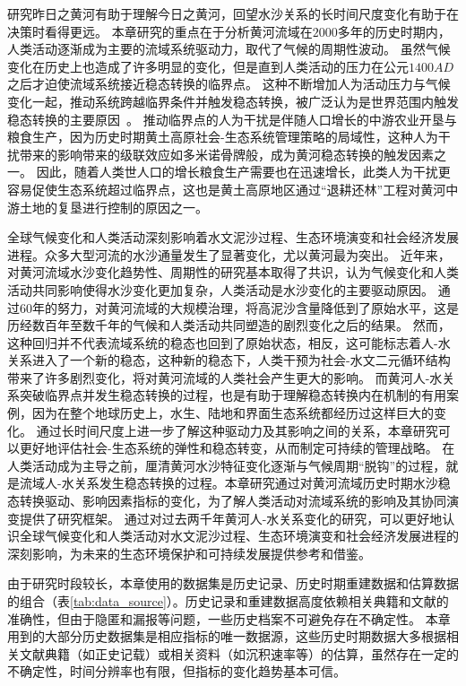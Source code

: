 研究昨日之黄河有助于理解今日之黄河，回望水沙关系的长时间尺度变化有助于在决策时看得更远。
本章研究的重点在于分析黄河流域在$2000$多年的历史时期内，人类活动逐渐成为主要的流域系统驱动力，取代了气候的周期性波动。
虽然气候变化在历史上也造成了许多明显的变化，但是直到人类活动的压力在公元$1400AD$之后才迫使流域系统接近稳态转换的临界点。
这种不断增加人为活动压力与气候变化一起，推动系统跨越临界条件并触发稳态转换，被广泛认为是世界范围内触发稳态转换的主要原因~\cite{scheffer2001,scheffer2003}。
推动临界点的人为干扰是伴随人口增长的中游农业开垦与粮食生产，因为历史时期黄土高原社会-生态系统管理策略的局域性，这种人为干扰带来的影响带来的级联效应如多米诺骨牌般，成为黄河稳态转换的触发因素之一\cite{rocha2018,wu2020a}。
因此，随着人类世人口的增长粮食生产需要也在迅速增长，此类人为干扰更容易促使生态系统超过临界点，这也是黄土高原地区通过“退耕还林”工程对黄河中游土地的复垦进行控制的原因之一。

全球气候变化和人类活动深刻影响着水文泥沙过程、生态环境演变和社会经济发展进程。众多大型河流的水沙通量发生了显著变化，尤以黄河最为突出\cite{best2019, best2020}。
近年来，对黄河流域水沙变化趋势性、周期性的研究基本取得了共识，认为气候变化和人类活动共同影响使得水沙变化更加复杂，人类活动是水沙变化的主要驱动原因\cite{wang2016a, ma2020}。
通过$60$年的努力，对黄河流域的大规模治理，将高泥沙含量降低到了原始水平，这是历经数百年至数千年的气候和人类活动共同塑造的剧烈变化之后的结果\cite{wang2016e, ji2018}。
然而，这种回归并不代表流域系统的稳态也回到了原始状态，相反，这可能标志着人-水关系进入了一个新的稳态，这种新的稳态下，人类干预为社会-水文二元循环结构带来了许多剧烈变化，将对黄河流域的人类社会产生更大的影响。
而黄河人-水关系突破临界点并发生稳态转换的过程，也是有助于理解稳态转换内在机制的有用案例，因为在整个地球历史上，水生、陆地和界面生态系统都经历过这样巨大的变化\cite{hughes2013, rocha2018}。
通过长时间尺度上进一步了解这种驱动力及其影响之间的关系，本章研究可以更好地评估社会-生态系统的弹性和稳态转变，从而制定可持续的管理战略\cite{scheffer2003}。
在人类活动成为主导之前，厘清黄河水沙特征变化逐渐与气候周期“脱钩”的过程，就是流域人-水关系发生稳态转换的过程。本章研究通过对黄河流域历史时期水沙稳态转换驱动、影响因素指标的变化，为了解人类活动对流域系统的影响及其协同演变提供了研究框架。
通过对过去两千年黄河人-水关系变化的研究，可以更好地认识全球气候变化和人类活动对水文泥沙过程、生态环境演变和社会经济发展进程的深刻影响，为未来的生态环境保护和可持续发展提供参考和借鉴。

由于研究时段较长，本章使用的数据集是历史记录、历史时期重建数据和估算数据的组合（表\ref{tab:data_source}）。历史记录和重建数据高度依赖相关典籍和文献的准确性，但由于隐匿和漏报等问题，一些历史档案不可避免存在不确定性\cite{wu2020a}。
本章用到的大部分历史数据集是相应指标的唯一数据源，这些历史时期数据大多根据相关文献典籍（如正史记载）或相关资料（如沉积速率等）的估算，虽然存在一定的不确定性，时间分辨率也有限，但指标的变化趋势基本可信。
